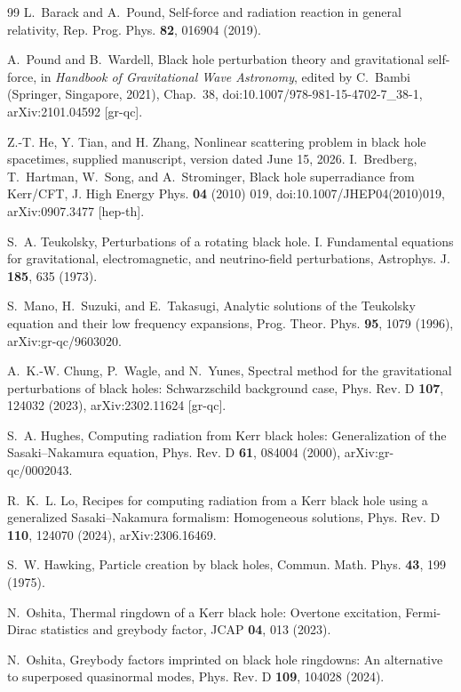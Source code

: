 \begin{thebibliography}{99}
L.~Barack and A.~Pound,
Self-force and radiation reaction in general relativity,
Rep. Prog. Phys. \textbf{82}, 016904 (2019).

A.~Pound and B.~Wardell,
Black hole perturbation theory and gravitational self-force,
in \textit{Handbook of Gravitational Wave Astronomy}, edited by
C.~Bambi (Springer, Singapore, 2021), Chap.~38,
doi:10.1007/978-981-15-4702-7\_38-1,
arXiv:2101.04592 [gr-qc].

Z.-T. He, Y. Tian, and H. Zhang,
Nonlinear scattering problem in black hole spacetimes,
supplied manuscript, version dated June 15, 2026.
I.~Bredberg, T.~Hartman, W.~Song, and A.~Strominger,
Black hole superradiance from Kerr/CFT,
J. High Energy Phys. \textbf{04} (2010) 019,
doi:10.1007/JHEP04(2010)019,
arXiv:0907.3477 [hep-th].

S.~A. Teukolsky,
Perturbations of a rotating black hole. I. Fundamental equations for
gravitational, electromagnetic, and neutrino-field perturbations,
Astrophys. J. \textbf{185}, 635 (1973).

S.~Mano, H.~Suzuki, and E.~Takasugi,
Analytic solutions of the Teukolsky equation and their low frequency
expansions,
Prog. Theor. Phys. \textbf{95}, 1079 (1996),
arXiv:gr-qc/9603020.

A.~K.-W. Chung, P.~Wagle, and N.~Yunes,
Spectral method for the gravitational perturbations of black holes:
Schwarzschild background case,
Phys. Rev. D \textbf{107}, 124032 (2023),
arXiv:2302.11624 [gr-qc].

S.~A. Hughes,
Computing radiation from Kerr black holes: Generalization of the
Sasaki--Nakamura equation,
Phys. Rev. D \textbf{61}, 084004 (2000),
arXiv:gr-qc/0002043.

R.~K.~L. Lo,
Recipes for computing radiation from a Kerr black hole using a generalized
Sasaki--Nakamura formalism: Homogeneous solutions,
Phys. Rev. D \textbf{110}, 124070 (2024),
arXiv:2306.16469.

S.~W. Hawking,
Particle creation by black holes,
Commun. Math. Phys. \textbf{43}, 199 (1975).

N.~Oshita,
Thermal ringdown of a Kerr black hole: Overtone excitation, Fermi-Dirac
statistics and greybody factor,
JCAP \textbf{04}, 013 (2023).

N.~Oshita,
Greybody factors imprinted on black hole ringdowns: An alternative to
superposed quasinormal modes,
Phys. Rev. D \textbf{109}, 104028 (2024).


\end{thebibliography}
